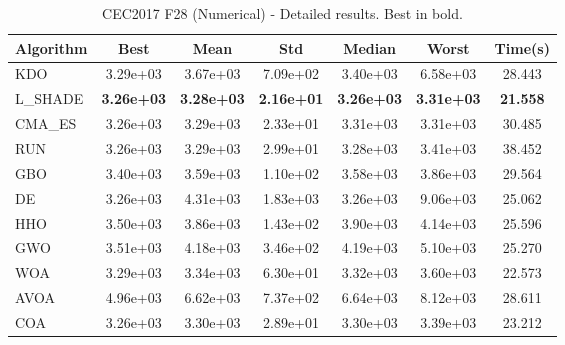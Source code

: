 \begin{table}[H]
\centering\small
\caption{CEC2017 F28 (Numerical) - Detailed results. Best in bold.}
\label{tab:cec2017_F28}
\begin{tabular}{lcccccc}
\toprule
\textbf{Algorithm} & \textbf{Best} & \textbf{Mean} & \textbf{Std} & \textbf{Median} & \textbf{Worst} & \textbf{Time(s)} \\
\midrule
KDO & 3.29e+03 & 3.67e+03 & 7.09e+02 & 3.40e+03 & 6.58e+03 & 28.443 \\
L_SHADE & \textbf{3.26e+03} & \textbf{3.28e+03} & \textbf{2.16e+01} & \textbf{3.26e+03} & \textbf{3.31e+03} & \textbf{21.558} \\
CMA_ES & 3.26e+03 & 3.29e+03 & 2.33e+01 & 3.31e+03 & 3.31e+03 & 30.485 \\
RUN & 3.26e+03 & 3.29e+03 & 2.99e+01 & 3.28e+03 & 3.41e+03 & 38.452 \\
GBO & 3.40e+03 & 3.59e+03 & 1.10e+02 & 3.58e+03 & 3.86e+03 & 29.564 \\
DE & 3.26e+03 & 4.31e+03 & 1.83e+03 & 3.26e+03 & 9.06e+03 & 25.062 \\
HHO & 3.50e+03 & 3.86e+03 & 1.43e+02 & 3.90e+03 & 4.14e+03 & 25.596 \\
GWO & 3.51e+03 & 4.18e+03 & 3.46e+02 & 4.19e+03 & 5.10e+03 & 25.270 \\
WOA & 3.29e+03 & 3.34e+03 & 6.30e+01 & 3.32e+03 & 3.60e+03 & 22.573 \\
AVOA & 4.96e+03 & 6.62e+03 & 7.37e+02 & 6.64e+03 & 8.12e+03 & 28.611 \\
COA & 3.26e+03 & 3.30e+03 & 2.89e+01 & 3.30e+03 & 3.39e+03 & 23.212 \\
\bottomrule
\end{tabular}
\end{table}

